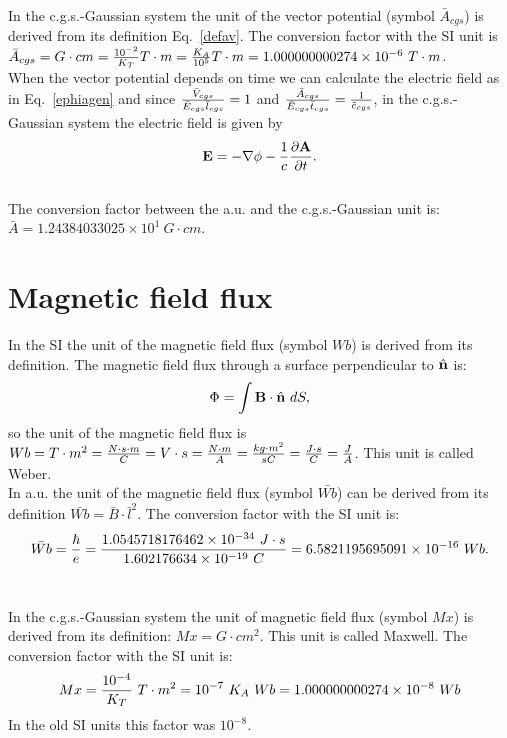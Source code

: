 \documentclass[12pt,a4paper]{article}
\def\hbarf{1.0545718176462\times 10^{-34}}
\def\e{1.602176634\times 10^{-19}}
\def\barwb{6.5821195695091\times 10^{-16}}
\def\avtoav{1.000000000274\times 10^{-6}}
\def\wbtowb{1.000000000274\times 10^{-8}}
\def\baravcgs{1.24384033025\times 10^{1}}
\begin{document}
{\color{orange} In the c.g.s.-Gaussian system the unit of the vector 
potential (symbol $\bar A_{cgs}$) is derived from its definition 
Eq.~\ref{defav}.
The conversion factor with the SI unit is 
$\bar A_{cgs} = G \cdot cm = {10^{-2}\over K_T} T\cdot m=
{K_A \over 10^5} T\cdot m=\avtoav\ T\cdot m$. \\

When the vector potential depends on time we can calculate the electric
field as in Eq.~\ref{ephiagen} and since 
${\bar V_{cgs} \over \bar E_{cgs} \bar l_{cgs}}=1$
and ${\bar A_{cgs} \over \bar E_{cgs} \bar t_{cgs}}={1\over 
\tilde c_{cgs}}$, in the 
c.g.s.-Gaussian system the electric field is given by
\begin{equation}
{\bf E}=-\nabla \phi -
{1 \over c} {\partial {\bf A} \over \partial t}.
\end{equation}
}
\\

{\color{green}
The conversion factor between the a.u. and the c.g.s.-Gaussian unit is:
$\bar A = \baravcgs\ G\cdot cm$.
}

\newpage
\section{\color{coral}Magnetic field flux}
In the SI the unit of the magnetic field flux (symbol $Wb$)
is derived from its definition. The  
magnetic field flux through a surface perpendicular to 
$\hat {\bf n}$ is:
\begin{equation}
\Phi=\int {\bf B}\cdot \hat {\bf n}\ dS,
\end{equation}
so the unit of the magnetic field flux is $Wb= T \cdot m^2={N \cdot s\cdot m
\over C}=V\cdot s={N\cdot m\over A}={kg\cdot m^2 \over s C}=
{J\cdot s\over C}={J\over A}$. This
unit is called Weber.
\\

{\color{web-blue} In a.u. the unit of the magnetic field flux
(symbol $\bar {Wb}$) can be derived from its definition
$\bar {Wb}=\bar B \cdot \bar l^2$. The conversion
factor with the SI unit is:
\begin{equation}
\bar {Wb} = {\hbar \over e}=
{\hbarf\ J\cdot s\over \e\ C}=\barwb\ Wb.
\end{equation}
\\
}

{\color{orange} In the c.g.s.-Gaussian system the unit of magnetic field
flux (symbol $Mx$) is derived from its definition: $Mx=G\cdot cm^2$.
This unit is called Maxwell.
The conversion factor with the SI unit is:
\begin{equation}
Mx = {10^{-4}\over K_T}\ T\cdot m^2 = 10^{-7}\ K_A\ Wb =\wbtowb\ Wb
\end{equation}
In the old SI units this factor was $10^{-8}$.
}
\\
\end{document}
